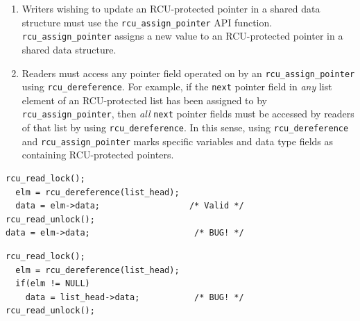 \documentclass[preprint]{sigplanconf}
\begin{document}
\begin{enumerate}
	\item Writers wishing to update an RCU-protected pointer in a shared data structure must use the \texttt{rcu\_assign\_pointer} API function. \texttt{rcu\_assign\_pointer} assigns a new value to an RCU-protected pointer in a shared data structure.

	\item Readers must access any pointer field operated on by an \texttt{rcu\_\linebreak[0]assign\_pointer} using \texttt{rcu\_\linebreak[0]dereference}. For example, if the \texttt{next} pointer field in \emph{any} list element of an RCU-protected list has been assigned to by \texttt{rcu\_assign\_\linebreak[0]pointer}, then \emph{all} \texttt{next} pointer fields must be accessed by readers of that list by using \texttt{rcu\_\linebreak[0]dereference}. In this sense, using \texttt{rcu\_\linebreak[0]dereference} and \texttt{rcu\_assign\_\linebreak[0]pointer} marks specific variables and data type fields as containing RCU-protected pointers.

\end{enumerate}

%


\newsavebox\rcuexistencebug
\begin{lrbox}{\rcuexistencebug}
\begin{lstlisting}[basicstyle=\footnotesize\ttfamily]
rcu_read_lock();
  elm = rcu_dereference(list_head);
  data = elm->data;                  /* Valid */
rcu_read_unlock();
data = elm->data;                     /* BUG! */
\end{lstlisting}
\end{lrbox}

\newsavebox\rcuderefbug
\begin{lrbox}{\rcuderefbug}
\begin{lstlisting}[basicstyle=\footnotesize\ttfamily]
rcu_read_lock();
  elm = rcu_dereference(list_head);
  if(elm != NULL)
    data = list_head->data;           /* BUG! */
rcu_read_unlock();
\end{lstlisting}
\end{lrbox}
\end{document}
